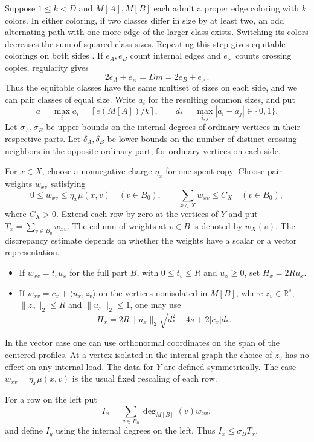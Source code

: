 \documentclass[11pt]{article}
\begin{document}
Suppose \(1\le k<D\) and \(M[A],M[B]\) each admit a proper edge coloring with \(k\) colors. In either coloring, if two classes differ in size by at least two, an odd alternating path with one more edge of the larger class exists. Switching its colors decreases the sum of squared class sizes. Repeating this step gives equitable colorings on both sides \cite{McDiarmid,CariolaroFu}. If \(e_A,e_B\) count internal edges and \(e_\times\) counts crossing copies, regularity gives
\[
 2e_A+e_\times=Dm=2e_B+e_\times.
\]
Thus the equitable classes have the same multiset of sizes on each side, and we can pair classes of equal size. Write \(a_i\) for the resulting common sizes, and put
\[
 a=\max_i a_i=\left\lceil e(M[A])/k\right\rceil,\qquad
 d_*=\max_{i,j}|a_i-a_j|\in\{0,1\}.
\]
Let \(\sigma_A,\sigma_B\) be upper bounds on the internal degrees of ordinary vertices in their respective parts. Let \(\delta_A,\delta_B\) be lower bounds on the number of distinct crossing neighbors in the opposite ordinary part, for ordinary vertices on each side.

For \(x\in X\), choose a nonnegative charge \(\eta_x\) for one spent copy. Choose pair weights \(w_{xv}\) satisfying
\[
 0\le w_{xv}\le \eta_x\mu(x,v)\quad (v\in B_0),\qquad
 \sum_{x\in X}w_{xv}\le C_X\quad(v\in B_0),
\]
where \(C_X>0\). Extend each row by zero at the vertices of \(Y\) and put \(T_x=\sum_{v\in B_0}w_{xv}\). The column of weights at \(v\in B\) is denoted by \(w_X(v)\). The discrepancy estimate depends on whether the weights have a scalar or a vector representation.
\begin{itemize}
\item If \(w_{xv}=t_v u_x\) for the full part \(B\), with \(0\le t_v\le R\) and \(u_x\ge0\), set \(H_x=2R u_x\).
\item If \(w_{xv}=c_x+\langle u_x,z_v\rangle\) on the vertices nonisolated in \(M[B]\), where \(z_v\in\mathbb R^s\), \(\|z_v\|_2\le R\) and \(\|u_x\|_2\le1\), one may use
\[
 H_x=2R\|u_x\|_2\sqrt{d_*^2+4s}+2|c_x|d_* .
\]
\end{itemize}
In the vector case one can use orthonormal coordinates on the span of the centered profiles. At a vertex isolated in the internal graph the choice of \(z_v\) has no effect on any internal load. The data for \(Y\) are defined symmetrically. The case \(w_{xv}=\eta_x\mu(x,v)\) is the usual fixed rescaling of each row.

For a row on the left put
\[
 I_x=\sum_{v\in B_0}\deg_{M[B]}(v)w_{xv},
\]
and define \(I_y\) using the internal degrees on the left. Thus \(I_x\le\sigma_B T_x\).
\end{document}

